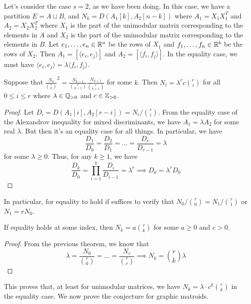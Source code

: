 \documentclass[12pt]{article}
\begin{document}
Let's consider the case $s = 2$, as we have been doing. In this case, we have a partition $E = A \sqcup B$, and $N_k = D(A_1[k], A_2[n-k])$ where $A_1 = X_1 X_1^T$ and $A_2 = X_2 X_2^T$ where $X_1$ is the part of the unimodular matrix corresponding to the elements in $A$ and $X_2$ is the part of the unimodular matrix corresponding to the elements in $B$. Let $e_1, \ldots, e_n \in \mathbb{R}^a$ be the rows of $X_1$ and $f_1, \ldots, f_n \in \mathbb{R}^b$ be the rows of $X_2$. Then $A_1 = [\langle e_i, e_j \rangle ]$ and $A_2 = [\langle f_i, f_j \rangle]$. In the equality case, we must have $\langle e_i, e_j \rangle = \lambda \langle f_i, f_j \rangle$. 

\begin{thm}
	Suppose that $\frac{N_k}{\binom{r}{k}}^2 = \frac{N_{k-1}}{\binom{r}{k-1}} \frac{N_{k+1}}{\binom{r}{k+1}}$ for some $k$. Then $N_i = \lambda^r c \binom{r}{i}$ for all $0 \leq i \leq r$ where $\lambda \in \mathbb{Q}_{> 0}$ and $c \in \mathbb{Z}_{> 0}$. 
\end{thm}

\begin{proof}
	Let $D_i = D(A_1[i], A_2 [r-i]) = N_i / \binom{r}{i}$. From the equality case of the Alexandrov inequality for mixed discriminants, we have $A_1 = \lambda A_2$ for some real $\lambda$. But then it's an equality case for all things. In particular, we have 
	\[
		\frac{D_1}{D_0} = \frac{D_2}{D_1} = \ldots = \frac{D_r}{D_{r-1}} = \lambda
	\]
	for some $\lambda \geq 0$. Thus, for any $k \geq 1$, we have 
	\[
		\frac{D_k}{D_0} = \prod_{i = 1}^k \frac{D_{i}}{D_{i-1}} = \lambda^r \implies D_k = \lambda^r D_0
	\]
\end{proof}

In particular, for equality to hold if suffices to verify that $N_0 / \binom{r}{0} = N_1 / \binom{r}{1}$ or $N_1 = r N_0$. 

\begin{thm}
	If equality holds at some index, then $N_k = a\binom{r}{k}$ for some $ a \geq 0$ and $c > 0$. 
\end{thm}

\begin{proof}
	From the previous theorem, we know that 
	\[
		\lambda = \frac{N_0}{\binom{r}{0}} = \ldots = \frac{N_r}{\binom{r}{r}} \implies N_k = \binom{r}{k} \lambda 
	\]
\end{proof}
This proves that, at least for unimodular matrices, we have $N_k = \lambda \cdot c^k \binom{r}{k}$ in the equality case. We now prove the conjecture for graphic matroids. 
\end{document}
